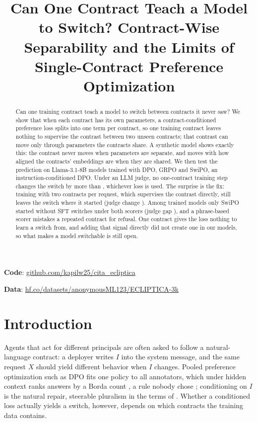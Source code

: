 \documentclass[letterpaper]{article} %
\title{Can One Contract Teach a Model to Switch? Contract-Wise Separability and the Limits of Single-Contract Preference Optimization}  %
\begin{document}
\maketitle

\begin{abstract}
Can one training contract teach a model to switch between contracts it never saw? We show that when each contract has its own parameters, a contract-conditioned preference loss splits into one term per contract, so one training contract leaves nothing to supervise the contrast between two unseen contracts; that contrast can move only through parameters the contracts share. A synthetic model shows exactly this: the contrast never moves when parameters are separate, and moves with how aligned the contracts' embeddings are when they are shared. We then test the prediction on Llama-3.1-8B models trained with DPO, GRPO and SwiPO, an instruction-conditioned DPO. Under an LLM judge, no one-contract training step changes the switch by more than \nJudgeStepHi{}, whichever loss is used. The surprise is the fix: training with two contracts per request, which supervises the contrast directly, still leaves the switch where it started (judge change \nGoneJudgeVsStart{}). Among trained models only SwiPO started without SFT switches under both scorers (judge gap \nSwiPORJudge{}), and a phrase-based scorer mistakes a repeated contract for refusal. One contract gives the loss nothing to learn a switch from, and adding that signal directly did not create one in our models, so what makes a model switchable is still open.
\end{abstract}

\begin{links}
    \renewcommand{\link}[2]{\par\textbf{#1}: \url{#2}}%
    \link{Code}{github.com/kapilw25/cita_ecliptica}
    \link{Data}{hf.co/datasets/anonymousML123/ECLIPTICA-3k}
\end{links}

\section{Introduction}

Agents that act for different principals are often asked to follow a natural-language contract: a deployer writes $I$ into the system message, and the same request $X$ should yield different behavior when $I$ changes. Pooled preference optimization such as DPO \cite{rafailov2023direct} fits one policy to all annotators, which under hidden context ranks answers by a Borda count \cite{siththaranjan2024distributional}, a rule nobody chose \cite{conitzer2024social}; conditioning on $I$ is the natural repair, steerable pluralism in the terms of \citet{sorensen2024roadmap}. Whether a conditioned loss actually yields a switch, however, depends on which contracts the training data contains.
\end{document}

